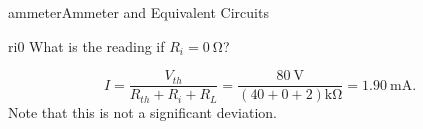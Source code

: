 \begin{mainquestion}{ammeter}{Ammeter and Equivalent Circuits}
\begin{partquestion}{ri0}
{What is the reading if $R_i = \SI{0}{\ohm}$?}

\begin{answer}[1in]
        \[ I = \frac{V_{th}}{R_{th} + R_i + R_L} = \frac{\SI{80}{\volt}}{(40 + 0 + 2)\si{\kilo\ohm}} = \SI{1.90}{\milli\ampere}. \]
        Note that this is not a significant deviation.
\end{answer}

\end{partquestion}

\end{mainquestion}
